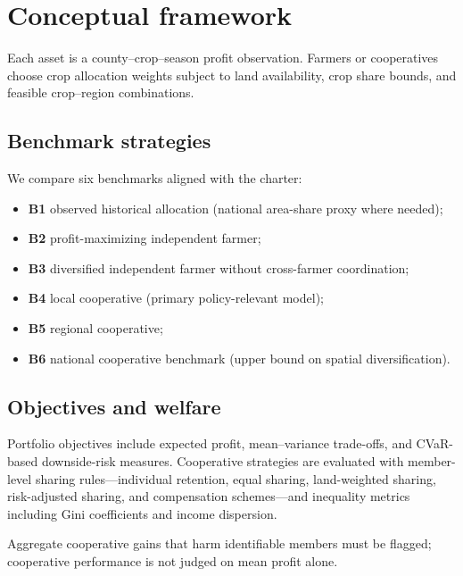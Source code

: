 \section{Conceptual framework}
\label{sec:framework}

Each asset is a county--crop--season profit observation.
Farmers or cooperatives choose crop allocation weights subject to land availability,
crop share bounds, and feasible crop--region combinations.

\subsection{Benchmark strategies}

We compare six benchmarks aligned with the \copper{} charter:
\begin{itemize}
  \item \textbf{B1} observed historical allocation (national area-share proxy where needed);
  \item \textbf{B2} profit-maximizing independent farmer;
  \item \textbf{B3} diversified independent farmer without cross-farmer coordination;
  \item \textbf{B4} local cooperative (primary policy-relevant model);
  \item \textbf{B5} regional cooperative;
  \item \textbf{B6} national cooperative benchmark (upper bound on spatial diversification).
\end{itemize}

\subsection{Objectives and welfare}

Portfolio objectives include expected profit, mean--variance trade-offs, and CVaR-based
downside-risk measures.
Cooperative strategies are evaluated with member-level sharing rules---individual retention,
equal sharing, land-weighted sharing, risk-adjusted sharing, and compensation schemes---and
inequality metrics including Gini coefficients and income dispersion.

Aggregate cooperative gains that harm identifiable members must be flagged; cooperative
performance is not judged on mean profit alone.
